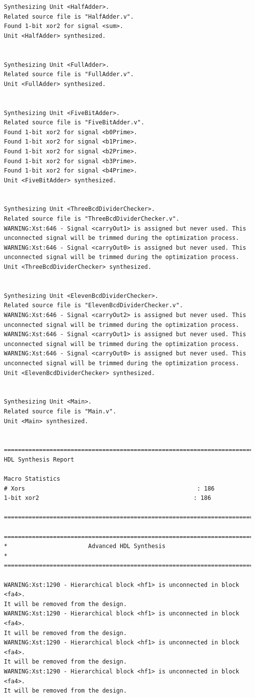 \documentclass[fleqn]{article}
\begin{document}
\begin{latin}
\begin{lstlisting}[basicstyle=\tiny]
Synthesizing Unit <HalfAdder>.
Related source file is "HalfAdder.v".
Found 1-bit xor2 for signal <sum>.
Unit <HalfAdder> synthesized.


Synthesizing Unit <FullAdder>.
Related source file is "FullAdder.v".
Unit <FullAdder> synthesized.


Synthesizing Unit <FiveBitAdder>.
Related source file is "FiveBitAdder.v".
Found 1-bit xor2 for signal <b0Prime>.
Found 1-bit xor2 for signal <b1Prime>.
Found 1-bit xor2 for signal <b2Prime>.
Found 1-bit xor2 for signal <b3Prime>.
Found 1-bit xor2 for signal <b4Prime>.
Unit <FiveBitAdder> synthesized.


Synthesizing Unit <ThreeBcdDividerChecker>.
Related source file is "ThreeBcdDividerChecker.v".
WARNING:Xst:646 - Signal <carryOut1> is assigned but never used. This 
unconnected signal will be trimmed during the optimization process.
WARNING:Xst:646 - Signal <carryOut0> is assigned but never used. This 
unconnected signal will be trimmed during the optimization process.
Unit <ThreeBcdDividerChecker> synthesized.


Synthesizing Unit <ElevenBcdDividerChecker>.
Related source file is "ElevenBcdDividerChecker.v".
WARNING:Xst:646 - Signal <carryOut2> is assigned but never used. This 
unconnected signal will be trimmed during the optimization process.
WARNING:Xst:646 - Signal <carryOut1> is assigned but never used. This 
unconnected signal will be trimmed during the optimization process.
WARNING:Xst:646 - Signal <carryOut0> is assigned but never used. This 
unconnected signal will be trimmed during the optimization process.
Unit <ElevenBcdDividerChecker> synthesized.


Synthesizing Unit <Main>.
Related source file is "Main.v".
Unit <Main> synthesized.


=========================================================================
HDL Synthesis Report

Macro Statistics
# Xors                                                 : 186
1-bit xor2                                            : 186

=========================================================================

=========================================================================
*                       Advanced HDL Synthesis                          *
=========================================================================

WARNING:Xst:1290 - Hierarchical block <hf1> is unconnected in block <fa4>.
It will be removed from the design.
WARNING:Xst:1290 - Hierarchical block <hf1> is unconnected in block <fa4>.
It will be removed from the design.
WARNING:Xst:1290 - Hierarchical block <hf1> is unconnected in block <fa4>.
It will be removed from the design.
WARNING:Xst:1290 - Hierarchical block <hf1> is unconnected in block <fa4>.
It will be removed from the design.


\end{lstlisting}
\end{latin}
\end{document}
